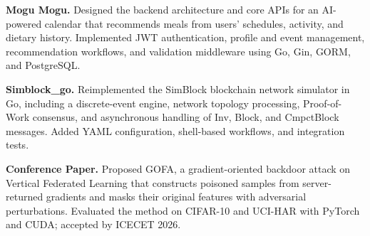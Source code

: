 \documentclass[letterpaper,11pt]{article}
\newcommand{\projectEntry}[2]{%
  \textbf{#1.} #2\par\vspace{0.62em}
}
\begin{document}
\projectEntry{Mogu Mogu}{Designed the backend architecture and core APIs for
an AI-powered calendar that recommends meals from users' schedules, activity,
and dietary history. Implemented JWT authentication, profile and event
management, recommendation workflows, and validation middleware using Go,
Gin, GORM, and PostgreSQL.}

\projectEntry{Simblock\_go}{Reimplemented the SimBlock blockchain network
simulator in Go, including a discrete-event engine, network topology
processing, Proof-of-Work consensus, and asynchronous handling of Inv, Block,
and CmpctBlock messages. Added YAML configuration, shell-based workflows, and
integration tests.}

\projectEntry{Conference Paper}{Proposed GOFA, a gradient-oriented backdoor
attack on Vertical Federated Learning that constructs poisoned samples from
server-returned gradients and masks their original features with adversarial
perturbations. Evaluated the method on CIFAR-10 and UCI-HAR with PyTorch and
CUDA; accepted by ICECET 2026.}
\end{document}
